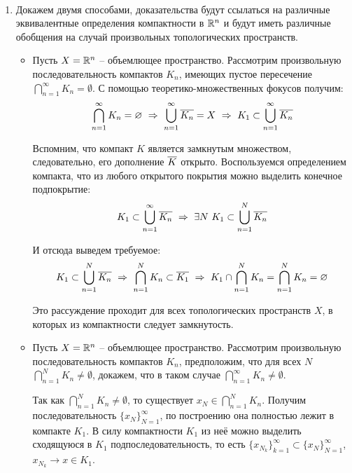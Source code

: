 \begin{solution}~
    \begin{enumerate}
        \item Докажем двумя способами, доказательства будут ссылаться на различные эквивалентные определения компактности в $\mathbb{R}^n$ и будут иметь различные обобщения на случай произвольных топологических пространств.

        \begin{itemize}
            \item Пусть $X = \mathbb{R}^n$ -- объемлющее пространство. Рассмотрим произвольную последовательность компактов $K_n$, имеющих пустое пересечение $\bigcap_{n=1}^\infty K_n = \emptyset$. С помощью теоретико-множественных фокусов получим:
            \[
                \bigcap_{n=1}^\infty K_n = \emptyset \ \Ra \ \bigcup_{n=1}^\infty \ol{K_n} = X \ \Ra \ K_1 \subset \bigcup_{n=1}^\infty \ol{K_n}
            \]
            
            Вспомним, что компакт $K$ является замкнутым множеством, следовательно, его дополнение $\overline{K}$ открыто. Воспользуемся определением компакта, что из любого открытого покрытия можно выделить конечное подпокрытие:
            \[
                K_1 \subset \bigcup_{n=1}^\infty \overline{K_n} \ \Rightarrow \ \exists N \ K_1 \subset \bigcup_{n=1}^N \overline{K_n}
            \]

            И отсюда выведем требуемое:
            \[
                K_1 \subset \bigcup_{n=1}^N \ol{K_n} \ \Ra \ \bigcap_{n=1}^N K_n \subset \ol{K_1} \ \Ra \ K_1 \cap \bigcap_{n=1}^N K_n = \bigcap_{n=1}^N K_n = \emptyset
            \]

            Это рассуждение проходит для всех топологических пространств $X$, в которых из компактности следует замкнутость.

            \item Пусть $X = \mathbb{R}^n$ -- объемлющее пространство. Рассмотрим произвольную последовательность компактов $K_n$, предположим, что для всех $N$ $\bigcap_{n=1}^N K_n \neq \emptyset$, докажем, что в таком случае $\bigcap_{n=1}^\infty K_n \neq \emptyset$.

            Так как $\bigcap_{n=1}^N K_n \neq \emptyset$, то существует $x_N \in \bigcap_{n=1}^N K_n$. Получим последовательность $\{x_N\}_{N=1}^\infty$, по построению она полностью лежит в компакте $K_1$. В силу компактности $K_1$ из неё можно выделить сходящуюся в $K_1$ подпоследовательность, то есть $\{x_{N_k}\}_{k=1}^\infty \subset \{x_N\}_{N=1}^\infty$, $x_{N_k} \to x \in K_1$.
            

\end{itemize}
\end{enumerate}
\end{solution}
